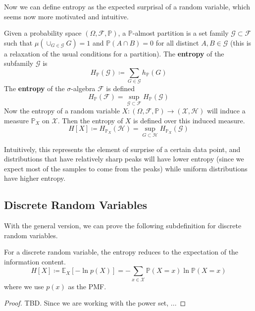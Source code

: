 \documentclass{article}
\begin{document}
    Now we can define entropy as the expected surprisal of a random variable, which seems now more motivated and intuitive. 

    \begin{definition}[Entropy]
      Given a probability space $(\Omega, \mathcal{F}, \mathbb{P})$, a $\mathbb{P}$-almost partition is a set family $\mathcal{G} \subset \mathcal{F}$ such that $\mu(\cup_{G \in \mathcal{G}} G) = 1$ and $\mathbb{P}(A \cap B) = 0$ for all distinct $A, B \in \mathcal{G}$ (this is a relaxation of the usual conditions for a partition). The \textbf{entropy} of the subfamily $\mathcal{G}$ is 
      \begin{equation}
        H_\mathbb{P} (\mathcal{G}) \coloneqq \sum_{G \in \mathcal{G}} h_\mathbb{P}(G)
      \end{equation}
      The \textbf{entropy} of the $\sigma$-algebra $\mathcal{F}$ is defined 
      \begin{equation}
        H_\mathbb{P} (\mathcal{F}) = \sup_{\mathcal{G} \subset \mathcal{F}} H_\mathbb{P} (\mathcal{G})
      \end{equation}
      Now the entropy of a random variable $X: (\Omega, \mathcal{F}, \mathbb{P}) \rightarrow (\mathcal{X}, \mathcal{H})$ will induce a measure $\mathbb{P}_X$ on $\mathcal{X}$. Then the entropy of $X$ is defined over this induced measure. 
      \begin{equation}
        H[X] \coloneqq H_{\mathbb{P}_{X}} (\mathcal{H}) = \sup_{G \subset \mathcal{H}} H_{\mathbb{P}_X} (\mathcal{G})
      \end{equation}
    \end{definition}

    Intuitively, this represents the element of surprise of a certain data point, and distributions that have relatively sharp peaks will have lower entropy (since we expect most of the samples to come from the peaks) while uniform distributions have higher entropy. 

  \subsection{Discrete Random Variables}

    With the general version, we can prove the following subdefinition for discrete random variables. 

    \begin{lemma}
      For a discrete random variable, the entropy reduces to the expectation of the information content. 
      \begin{equation}
        H[X] \coloneqq \mathbb{E}_X [-\ln{p(X)}] = -\sum_{x \in \mathcal{X}} \mathbb{P}(X = x) \ln{\mathbb{P}(X = x)}
      \end{equation}
      where we use $p(x)$ as the PMF. 
    \end{lemma}
    \begin{proof}
      TBD. Since we are working with the power set, ...
    \end{proof}
\end{document}

